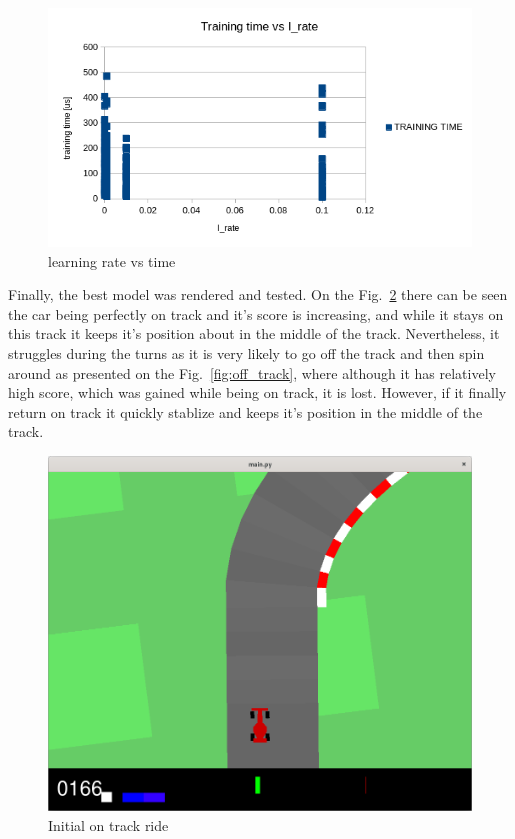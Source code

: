 \documentclass[runningheads]{llncs}
\begin{document}
\begin{figure}
  \includegraphics[width=\textwidth]{Screenshots/rate_vs_time.png}
  \caption{learning rate vs time}
  \label{fig:time}
\end{figure}

Finally, the best model was rendered and tested. On the Fig.~\ref{fig:on_track} there can be seen the car being perfectly on track and it's score is increasing, and while it stays on this track it keeps it's position about in the middle of the track. Nevertheless, it struggles during the turns as it is very likely to go off the track and then spin around as presented on the Fig.~\ref{fig:off_track}, where although it has relatively high score, which was gained while being on track, it is lost. However, if it finally return on track it quickly stablize and keeps it's position in the middle of the track.
\begin{figure}
  \includegraphics[width=\textwidth]{Screenshots/on_track.png}
  \caption{Initial on track ride}
  \label{fig:on_track}
\end{figure}
\end{document}
